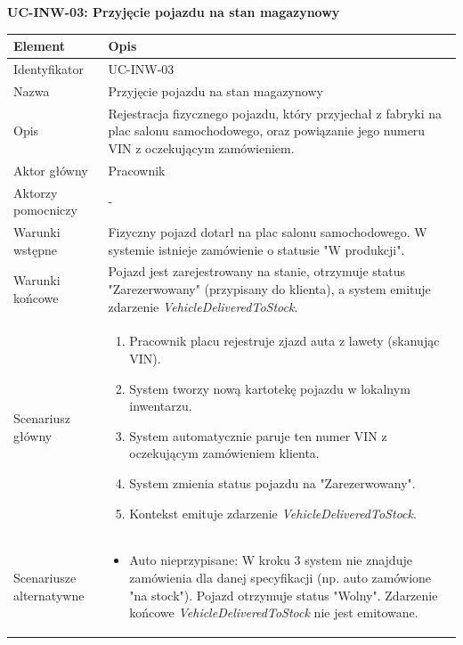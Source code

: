 \textbf{UC-INW-03: Przyjęcie pojazdu na stan magazynowy}

\begin{longtable}{|p{4cm}|p{11cm}|}
\hline
\textbf{Element} & \textbf{Opis} \\
\hline

Identyfikator & UC-INW-03 \\
\hline

Nazwa & Przyjęcie pojazdu na stan magazynowy \\
\hline

Opis & 
Rejestracja fizycznego pojazdu, który przyjechał z fabryki na plac salonu samochodowego, oraz powiązanie jego numeru VIN z oczekującym zamówieniem. \\
\hline

Aktor główny & Pracownik \\
\hline

Aktorzy pomocniczy & - \\
\hline

Warunki wstępne & 
Fizyczny pojazd dotarł na plac salonu samochodowego. W systemie istnieje zamówienie o statusie "W produkcji". \\
\hline

Warunki końcowe & 
Pojazd jest zarejestrowany na stanie, otrzymuje status "Zarezerwowany" (przypisany do klienta), a system emituje zdarzenie \textit{VehicleDeliveredToStock}. \\
\hline

Scenariusz główny & 
\begin{enumerate}
    \item Pracownik placu rejestruje zjazd auta z lawety (skanując VIN).
    \item System tworzy nową kartotekę pojazdu w lokalnym inwentarzu.
    \item System automatycznie paruje ten numer VIN z oczekującym zamówieniem klienta.
    \item System zmienia status pojazdu na "Zarezerwowany".
    \item Kontekst emituje zdarzenie \textit{VehicleDeliveredToStock}.
\end{enumerate} \\
\hline

Scenariusze alternatywne & 
\begin{itemize}
    \item [A1] Auto nieprzypisane: W kroku 3 system nie znajduje zamówienia dla danej specyfikacji (np. auto zamówione "na stock"). Pojazd otrzymuje status "Wolny". Zdarzenie końcowe \textit{VehicleDeliveredToStock} nie jest emitowane.
\end{itemize} \\
\hline
\end{longtable}

